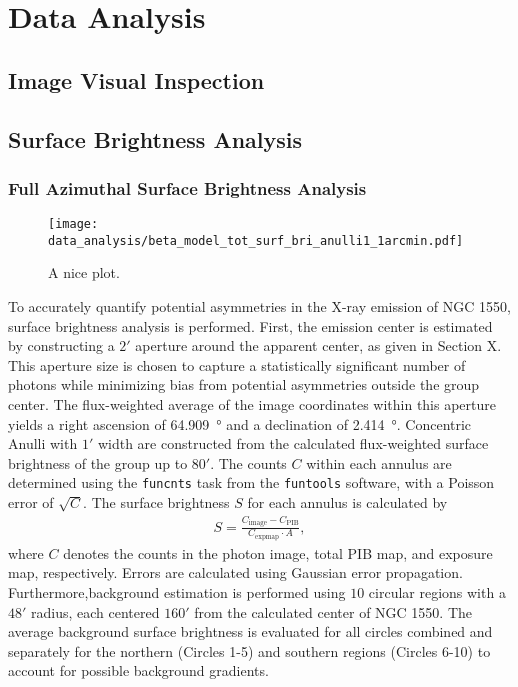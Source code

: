 
\chapter{Data Analysis}
\label{sec:data_analysis}
\section{Image Visual Inspection}
\section{Surface Brightness Analysis}
\subsection{Full Azimuthal Surface Brightness Analysis}
\begin{figure}[htbp]
    \centering
    \texttt{[image: data\_analysis/beta\_model\_tot\_surf\_bri\_anulli1\_1arcmin.pdf]}
    \caption{A nice plot.}
\end{figure}
To accurately quantify potential asymmetries in the X-ray emission of NGC 1550, surface brightness analysis is performed. First, the emission center is estimated by constructing a \(2'\) aperture around the apparent center, as given in Section X. This aperture size is chosen to capture a statistically significant number of photons while minimizing bias from potential asymmetries outside the group center. The flux-weighted average of the image coordinates within this aperture yields a right ascension of \SI{64.909}{\degree} and a declination of \SI{2.414}{\degree}. Concentric Anulli with \(1'\) width are constructed from the calculated flux-weighted surface brightness of the group up to \(80'\). The counts \(C\) within each annulus are determined using the \texttt{funcnts} task from the \texttt{funtools} software, with a Poisson error of \(\sqrt{C}\). The surface brightness \(S\) for each annulus is calculated by
\begin{align*}
    S = \frac{C_\text{image} - C_\text{PIB}}{C_\text{expmap}\cdot A},
\end{align*}
where \(C\) denotes the counts in the photon image, total PIB map, and exposure map, respectively. Errors are calculated using Gaussian error propagation. Furthermore,background estimation is performed using \(10\) circular regions with a \(48'\) radius, each centered \(160'\) from the calculated center of NGC 1550. The average background surface brightness is evaluated for all circles combined and separately for the northern (Circles 1-5) and southern regions (Circles 6-10) to account for possible background gradients. 
